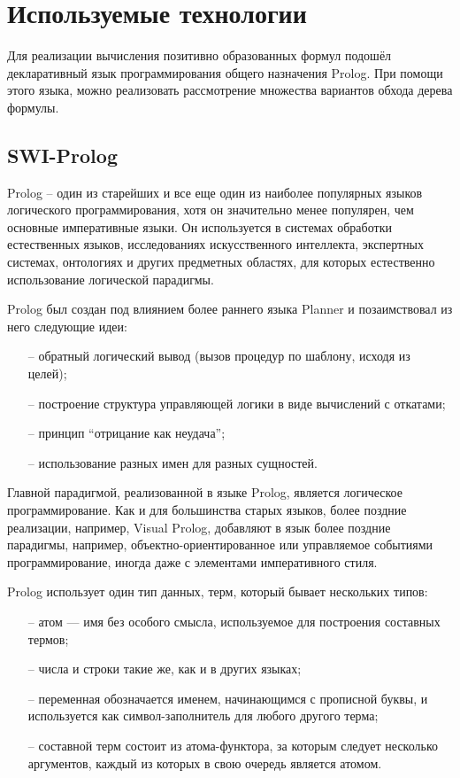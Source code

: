 \section{Используемые технологии}

	Для реализации вычисления позитивно образованных формул подошёл
		декларативный язык программирования общего назначения Prolog. При помощи этого языка,
		можно реализовать рассмотрение множества вариантов обхода дерева формулы.
	
	\subsection{SWI-Prolog}
		Prolog -- один из старейших и все еще один из наиболее популярных языков логического программирования,
			хотя он значительно менее популярен, чем основные императивные языки.
			Он используется в системах обработки естественных языков, исследованиях искусственного интеллекта,
			экспертных системах, онтологиях и других предметных областях,
			для которых естественно использование логической парадигмы. 
	
		Prolog был создан под влиянием более раннего языка Planner и позаимствовал из него следующие идеи:

		\begin{itemize}
			\item[--] обратный логический вывод (вызов процедур по шаблону, исходя из целей);
			\item[--] построение структура управляющей логики в виде вычислений с откатами;
			\item[--] принцип “отрицание как неудача”;
			\item[--] использование разных имен для разных сущностей.
		\end{itemize}

		Главной парадигмой, реализованной в языке Prolog, является логическое программирование.
			Как и для большинства старых языков, более поздние реализации, например, Visual Prolog,
			добавляют в язык более поздние парадигмы, например, объектно-ориентированное или управляемое
			событиями программирование, иногда даже с элементами императивного стиля.

		Prolog использует один тип данных, терм, который бывает нескольких типов:

		\begin{itemize}
			\item[--] атом — имя без особого смысла, используемое для построения составных термов;
			\item[--] числа и строки такие же, как и в других языках;
			\item[--] переменная обозначается именем, начинающимся с прописной буквы,
				и используется как символ-заполнитель для любого другого терма;
			\item[--] составной терм состоит из атома-функтора, за которым следует несколько аргументов,
				каждый из которых в свою очередь является атомом.
		\end{itemize}

